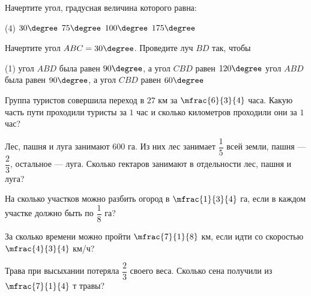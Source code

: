 %
%
\begin{class}[number=7]
	\begin{listofex}
		\item Начертите угол, градусная величина которого равна:
		\begin{tasks}(4)
			\task \( 30\degree \)
			\task \( 75\degree \)
			\task \( 100\degree \)
			\task \( 175\degree \)
		\end{tasks}	
		\item Начертите угол \( ABC=30\degree \). Проведите луч \( BD \) так, чтобы 
		\begin{tasks}(1)
			\task  угол \( ABD \) была равен \( 90\degree \), а угол \( CBD \) равен \( 120\degree \)
			\task  угол \( ABD \) была равен \( 90\degree \), а угол \( CBD \) равен \( 60\degree \)
		\end{tasks}	
		 \item Группа туристов совершила переход в \( 27 \) км за \( \mfrac{6}{3}{4} \) часа. Какую часть пути проходили туристы за \( 1 \) час и сколько километров проходили они за \( 1 \) час?
		 \item Лес, пашня и луга занимают \( 600 \) га. Из них лес занимает \( \dfrac{1}{5} \) всей земли, пашня --- \( \dfrac{2}{3} \), остальное --- луга. Сколько гектаров занимают в отдельности лес, пашня и луга?
		 \item На сколько участков можно разбить огород в \( \mfrac{1}{3}{4} \) га, если в каждом участке должно быть по \( \dfrac{1}{8} \) га?
		 \item За сколько времени можно пройти \( \mfrac{7}{1}{8} \) км, если идти со скоростью \( \mfrac{4}{3}{4} \) км/ч?
	 	\item Трава при высыхании потеряла \( \dfrac{2}{3} \) своего веса. Сколько сена получили из \( \mfrac{7}{1}{4} \) т травы?
	\end{listofex}
\end{class}
